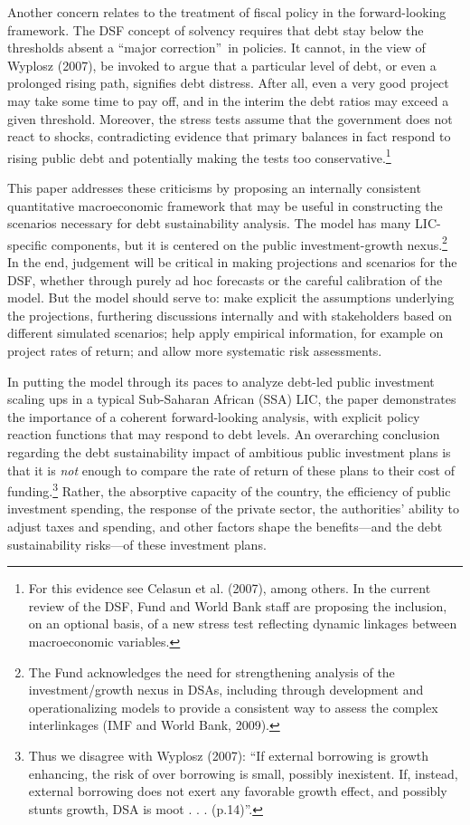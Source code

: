 \documentclass[11pt]{article}
\begin{document}
Another concern relates to the treatment of fiscal policy in the
forward-looking framework. The DSF concept of solvency requires that debt
stay below the thresholds absent a \textquotedblleft major
correction\textquotedblright\ in policies. It cannot, in the view of Wyplosz
(2007), be invoked to argue that a particular level of debt, or even a
prolonged rising path, signifies debt distress. After all, even a very good
project may take some time to pay off, and in the interim the debt ratios
may exceed a given threshold. Moreover, the stress tests assume that the
government does not react to shocks, contradicting evidence that primary
balances in fact respond to rising public debt and potentially making the
tests too conservative.\footnote{%
For this evidence see Celasun et al. (2007), among others. In the current
review of the DSF, Fund and World Bank staff are proposing the inclusion, on
an optional basis, of a new stress test reflecting dynamic linkages between
macroeconomic variables.}

This paper addresses these criticisms by proposing an internally consistent
quantitative macroeconomic framework that may be useful in constructing the
scenarios necessary for debt sustainability analysis. The model has many
LIC-specific components, but it is centered on the public investment-growth
nexus.\footnote{%
The Fund acknowledges the need for strengthening analysis of the
investment/growth nexus in DSAs, including through development and
operationalizing models to provide a consistent way to assess the complex
interlinkages (IMF and World Bank, 2009).} In the end, judgement will be
critical in making projections and scenarios for the DSF, whether through
purely ad hoc forecasts or the careful calibration of the model. But the
model should serve to: make explicit the assumptions underlying the
projections, furthering discussions internally and with stakeholders based
on different simulated scenarios; help apply empirical information, for
example on project rates of return; and allow more systematic risk
assessments.

In putting the model through its paces to analyze debt-led public investment
scaling ups in a typical Sub-Saharan African (SSA) LIC, the paper
demonstrates the importance of a coherent forward-looking analysis, with
explicit policy reaction functions that may respond to debt levels. An
overarching conclusion regarding the debt sustainability impact of ambitious
public investment plans is that it is \textit{not} enough to compare the
rate of return of these plans to their cost of funding.\footnote{%
Thus we disagree with Wyplosz (2007): \textquotedblleft If external
borrowing is growth enhancing, the risk of over borrowing is small, possibly
inexistent. If, instead, external borrowing does not exert any favorable
growth effect, and possibly stunts growth, DSA is moot . . .
(p.14)\textquotedblright .} Rather, the absorptive capacity of the country,
the efficiency of public investment spending, the response of the private
sector, the authorities' ability to adjust taxes and spending, and other
factors shape the benefits---and the debt sustainability risks---of these
investment plans.
\end{document}
